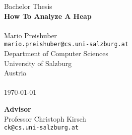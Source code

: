 
%

\makeatletter
{}
\makeatother




	
	
	\begin{titlepage}
		\centering

		\vspace*{\fill}
		{\LARGE 
		Bachelor Thesis									\\ \bigskip
		\textbf{How To Analyze A \JS Heap}}				\\ \bigskip
		~ \\ \bigskip
		\Large Mario Preishuber 						\\ \smallskip
		\large
		\texttt{mario.preishuber@cs.uni-salzburg.at}	\\ \bigskip
		Department of Computer Sciences					\\ \smallskip			
		University of Salzburg							\\ \smallskip
		Austria											\\ \bigskip 
		~ \\ \bigskip
		\today
		\vspace*{\fill}
		
		\textbf{Advisor} 								\\ \bigskip
		Professor Christoph Kirsch						\\ \smallskip
		\texttt{ck@cs.uni-salzburg.at}					\\ \bigskip
	\end{titlepage}
	
	
	
	
	
	
	
	
	
	
	
	
	
	
	\appendix
	
	
	
	
